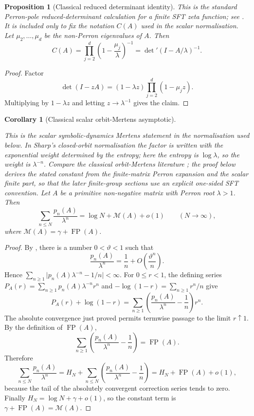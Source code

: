 \documentclass[11pt,a4paper]{amsart}
\theoremstyle{plain}
\newtheorem{proposition}[theorem]{Proposition}
\newtheorem{corollary}[theorem]{Corollary}
\theoremstyle{definition}
\theoremstyle{remark}
\DeclareMathOperator{\FP}{FP}
\newcommand{\abs}[1]{\lvert #1 \rvert}
\begin{document}
\begin{proposition}[Classical reduced determinant identity]
  \label{prop:finite-part-residue-reduced-determinant}
  This is the standard Perron-pole reduced-determinant calculation for a
  finite SFT zeta function; see
  \cite{BowenLanford1970Zeta,LindMarcus1995,ParryPollicott1990Zeta}.  It
  is included only to fix the notation \(C(A)\) used in the scalar
  normalisation.
  Let \(\mu_2,\dots,\mu_d\) be the non-Perron eigenvalues of \(A\). Then
  \[
    C(A)
    =\prod_{j=2}^d\left(1-\frac{\mu_j}{\lambda}\right)^{-1}
    =\det\nolimits'(I-A/\lambda)^{-1}.
  \]
\end{proposition}

\begin{proof}
  Factor
  \[
    \det(I-zA)
    =(1-\lambda z)\prod_{j=2}^d(1-\mu_j z).
  \]
  Multiplying by \(1-\lambda z\) and letting \(z\to\lambda^{-1}\) gives
  the claim.
\end{proof}

\begin{corollary}[Classical scalar orbit-Mertens asymptotic]
  \label{cor:finite-part-mertens-asymptotic}
  \leavevmode\par\noindent
  This is the scalar symbolic-dynamics Mertens statement in the normalisation
  used below.  In Sharp's closed-orbit normalisation the factor is written
  with the exponential weight determined by the entropy; here the entropy is
  \(\log\lambda\), so the weight is \(\lambda^{-n}\).  Compare the classical
  orbit-Mertens literature
  \cite{Sharp1991Mertens,ParryPollicott1990Zeta}; the proof below derives the
  stated constant from the finite-matrix Perron expansion and the scalar
  finite part, so that the later finite-group sections use an explicit
  one-sided SFT convention.
  Let \(A\) be a primitive non-negative matrix with Perron root
  \(\lambda>1\). Then
  \[
    \sum_{n\le N}\frac{p_n(A)}{\lambda^n}
    =\log N+\mathcal M(A)+o(1)
    \qquad (N\to\infty),
  \]
  where \(\mathcal M(A)=\gamma+\FP(A)\).
\end{corollary}

\begin{proof}
  By , there is a number
  \(0<\vartheta<1\) such that
  \[
    \frac{p_n(A)}{\lambda^n}
    =
    \frac{1}{n}+O\!\left(\frac{\vartheta^n}{n}\right).
  \]
  Hence
  \(\sum_{n\ge1}\abs{p_n(A)\lambda^{-n}-1/n}<\infty\). For
  \(0\le r<1\), the defining series
  \(P_A(r)=\sum_{n\ge1}p_n(A)\lambda^{-n}r^n\) and
  \(-\log(1-r)=\sum_{n\ge1}r^n/n\) give
  \[
    P_A(r)+\log(1-r)
    =
    \sum_{n\ge1}\left(\frac{p_n(A)}{\lambda^n}-\frac1n\right)r^n .
  \]
  The absolute convergence just proved permits termwise passage to the
  limit \(r\uparrow1\). By the definition of \(\FP(A)\),
  \[
    \sum_{n\ge1}\left(\frac{p_n(A)}{\lambda^n}-\frac1n\right)
    =\FP(A).
  \]
  Therefore
  \[
    \sum_{n\le N}\frac{p_n(A)}{\lambda^n}
    =H_N+
      \sum_{n\le N}\left(\frac{p_n(A)}{\lambda^n}-\frac1n\right)
    =H_N+\FP(A)+o(1),
  \]
  because the tail of the absolutely convergent correction series tends to
  zero. Finally \(H_N=\log N+\gamma+o(1)\), so the constant term is
  \(\gamma+\FP(A)=\mathcal M(A)\).
\end{proof}
\end{document}

